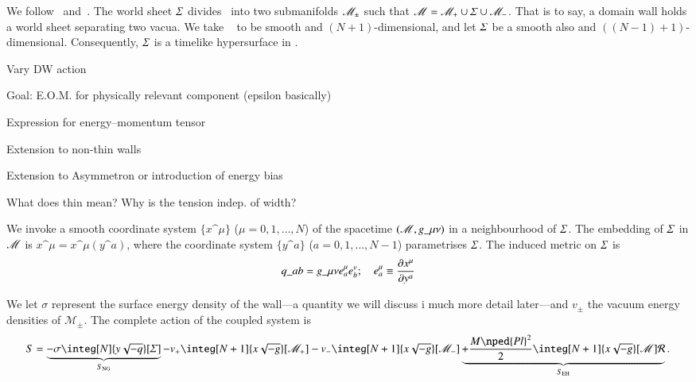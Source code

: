 





We follow~\citet{garrigaPerturbationsDomainWalls1991} and~\citet{ishibashiEquationMotionDomain1999}. The world sheet $\varSigma$ divides \Manifold~into two submanifolds $\mathscr{M}_{\pm}$ such that $\mathscr{M} = \mathscr{M}_+ \cup  \varSigma \cup \mathscr{M}_-$. That is to say, a domain wall holds a world sheet separating two vacua. We take \Manifold~ to be smooth and $(N+1)$-dimensional, and let $\varSigma$ be a smooth also and $((N-1)+1)$-dimensional. Consequently, $\varSigma$ is a timelike hypersurface in \Manifold. 


%


\begin{bullets}
    \item Vary DW action
    \item Goal: E.O.M. for physically relevant component (epsilon basically)
    \item Expression for energy--momentum tensor
    \item Extension to non-thin walls 
    \item Extension to Asymmetron or introduction of energy bias
    \item What does thin mean? Why is the tension indep. of width?
\end{bullets}


We invoke a smooth coordinate system $\{x\^\mu\}$ ($\mu=0,1,\dots,N$) of the spacetime $(\mathscr{M}, g\_{\mu\nu})$ in a neighbourhood of $\varSigma$. The embedding of $\varSigma$ in $\mathscr{M}$ is $x\^\mu = x\^\mu(y\^a)$, where the coordinate system $\{y\^a\}$ ($a=0,1,\dots,N-1$) parametrises $\varSigma$.
The induced metric on $\varSigma$ is
\begin{equation}\label{eq:pertwalls:thinwall:induced_metrid}
    q\_{ab} = g\_{\mu\nu} e^\mu_a e^\nu_b; \quad e^\mu_a \equiv \pdv{x\^\mu}{y\^a}%
\end{equation} 

We let $\sigma$ represent the surface energy density of the wall---a quantity we will discuss i much more detail later---and $v_\pm$ the vacuum energy densities of $\mathscr{M}_\pm$. The complete action of the coupled system is
\begin{equation}
    S = \underbrace{- \sigma \integ[N]{y\sqrt{-q}}[\hypsurf] }_{S\ped{NG}} %
    - v_+ \integ[N+1]{x\sqrt{-g}}[\mathscr{M}_+] %
    - v_- \integ[N+1]{x\sqrt{-g}}[\mathscr{M}_-] %
    \underbrace{+ \frac{M\nped{Pl}^2}{2}\integ[N+1]{x\sqrt{-g}}[\mathscr{M}] \mathcal{R}}_{S\ped{EH}}.
\end{equation}

